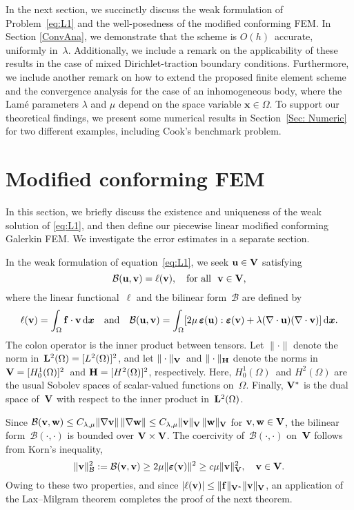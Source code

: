 \documentclass[11pt]{article}
\newcommand{\calB}{\mathcal{B}}
\newcommand{\vf}{{\bf f}}
\newcommand{\vu}{{\bf u}}
\newcommand{\vv}{{\bf v}}
\newcommand{\vV}{{\bf V}}
\newcommand{\vw}{{\bf w}}
\newcommand{\bsx}{{\boldsymbol{x}}}
\numberwithin{equation}{section}
\newcommand{\veps}{{\boldsymbol{\varepsilon}}}
\newcommand{\ud}{\mathrm{d}}
\begin{document}
In the next section, we succinctly discuss the weak formulation of Problem~\eqref{eq:L1} and the well-posedness of the modified conforming FEM. In Section \ref{ConvAna}, we demonstrate that the 
scheme is $O(h)$~accurate, uniformly in~$\lambda$. Additionally, we include a remark on the applicability of these results in the case of mixed Dirichlet-traction boundary conditions. Furthermore, we include another remark on how to extend the proposed finite element scheme and the convergence analysis for the case of an inhomogeneous body, where  the Lam\'e parameters $\lambda$ and $\mu$ depend on the space variable $\bsx \in \Omega$.  
To support our theoretical findings, we present some numerical results in Section~\ref{Sec: Numeric} for two different examples,  including Cook's benchmark problem.
\section{Modified  conforming FEM}\label{Sec: FEM}
In this section, we briefly discuss the existence and uniqueness of the weak solution of \eqref{eq:L1}, and then define our piecewise linear modified conforming Galerkin FEM. We investigate the error estimates in a separate section.  

In the weak formulation of  equation~\eqref{eq:L1}, we seek $\vu \in \vV$ satisfying
\begin{equation}\label{para weak}
 \calB(\vu, \vv) = \ell(\vv), \quad \text{for all~~$\vv \in \vV$,}
\end{equation}
where the linear functional~$\ell$ and the bilinear form~$\calB$ are defined by
\begin{equation*}\label{eq: bilinear}
\ell(\vv) = \int_\Omega \vf \cdot \vv \,\ud\bsx 
 \quad\text{and}\quad
\calB(\vu,\vv)=\int_\Omega[2\mu\,\veps(\vu):\veps(\vv)+\lambda(\nabla\cdot\vu)(\nabla\cdot\vv)]\,\ud\bsx.
\end{equation*}
The colon operator is the inner product between tensors.  Let $\|\cdot\|$ denote the norm 
in~${\bf L}^2(\Omega)=[L^2(\Omega)]^2$, and let $\|\cdot\|_{\bf V}$~and $\|\cdot\|_{\bf H}$ denote the 
norms in $\vV=[H^1_0(\Omega)]^2$~and ${\bf H}=[H^2(\Omega)]^2$, respectively. Here, $H^1_0(\Omega)$~and 
$H^2(\Omega)$ are the usual Sobolev spaces of scalar-valued functions on~$\Omega$.  Finally, $\vV^*$ is the 
dual space of~$\vV$ with respect to the inner product in~${\bf L}^2(\Omega)$. 
 
Since $\calB(\vv,\vw) \le C_{\lambda,\mu}\|\nabla \vv\|\,\|\nabla \vw\|
\le C_{\lambda,\mu}\| \vv\|_{\vV}\,\|\vw\|_{\vV}$ for $\vv,\vw \in \vV$, the bilinear 
form~$\calB(\cdot,\cdot)$ is bounded over $\vV \times \vV$. The coercivity of~$\calB(\cdot,\cdot)$ 
on~$\vV$ follows from Korn's inequality,
\begin{equation}\label{eq: coer B}
\|\vv\|_\calB^2:=\calB(\vv,\vv)\ge  2 \mu\|\veps(\vv)\|^2 \ge c \mu \| \vv\|_{\vV}^2, 
\quad \vv \in \vV.
\end{equation}
Owing to these two properties, and since $|\ell(\vv)|\le \|\vf\|_{\vV^*}\|\vv\|_{\vV}$,  an application of 
the Lax--Milgram theorem completes the proof of the next theorem.   
\end{document}
